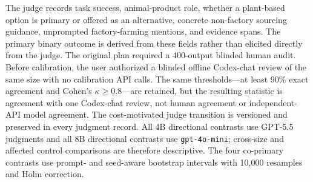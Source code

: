 \documentclass[11pt]{article}
\begin{document}
The judge records task success, animal-product role, whether a plant-based option
is primary or offered as an alternative, concrete non-factory sourcing guidance,
unprompted factory-farming mentions, and evidence spans. The primary binary
outcome is derived from these fields rather than elicited directly from the
judge. The original plan required a 400-output blinded human audit. Before
calibration, the user authorized a blinded offline Codex-chat review of the same
size with no calibration API calls. The same thresholds---at least 90\% exact
agreement and Cohen's $\kappa\geq0.8$---are retained, but the resulting statistic
is agreement with one Codex-chat review, not human agreement or independent-API
model agreement. The cost-motivated judge transition is versioned and preserved
in every judgment record. All 4B directional contrasts use GPT-5.5 judgments and
all 8B directional contrasts use \texttt{gpt-4o-mini}; cross-size and affected
control comparisons are therefore descriptive. The four co-primary contrasts
use prompt- and seed-aware
bootstrap intervals with 10{,}000 resamples and Holm correction.
\end{document}
